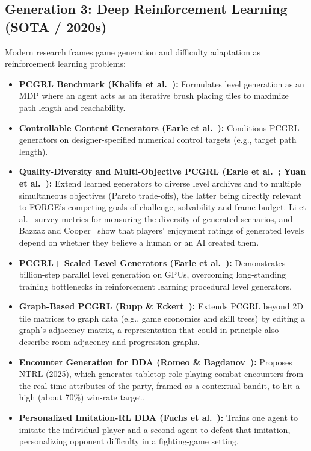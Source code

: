 \subsection{Generation 3: Deep Reinforcement Learning (SOTA / 2020s)}
Modern research frames game generation and difficulty adaptation as reinforcement learning problems:
\begin{itemize}
    \item \textbf{PCGRL Benchmark (Khalifa et al.~\cite{khalifa2020pcgrl}):} Formulates level generation as an MDP where an agent acts as an iterative brush placing tiles to maximize path length and reachability.
    \item \textbf{Controllable Content Generators (Earle et al.~\cite{earle2021controllable}):} Conditions PCGRL generators on designer-specified numerical control targets (e.g., target path length).
    \item \textbf{Quality-Diversity and Multi-Objective PCGRL (Earle et al.~\cite{earle2021illuminating}; Yuan et al.~\cite{yuan2026mopcgrl}):} Extend learned generators to diverse level archives and to multiple simultaneous objectives (Pareto trade-offs), the latter being directly relevant to FORGE's competing goals of challenge, solvability and frame budget. Li et al.~\cite{li2025measuring} survey metrics for measuring the diversity of generated scenarios, and Bazzaz and Cooper~\cite{bazzaz2026imitation} show that players' enjoyment ratings of generated levels depend on whether they believe a human or an AI created them.
    \item \textbf{PCGRL+ Scaled Level Generators (Earle et al.~\cite{earle2024pcgrlplus}):} Demonstrates billion-step parallel level generation on GPUs, overcoming long-standing training bottlenecks in reinforcement learning procedural level generators.
    \item \textbf{Graph-Based PCGRL (Rupp \& Eckert~\cite{rupp2024gpcgrl}):} Extends PCGRL beyond 2D tile matrices to graph data (e.g., game economies and skill trees) by editing a graph's adjacency matrix, a representation that could in principle also describe room adjacency and progression graphs.
    \item \textbf{Encounter Generation for DDA (Romeo \& Bagdanov~\cite{romeo2025ntrl}):} Proposes NTRL (2025), which generates tabletop role-playing combat encounters from the real-time attributes of the party, framed as a contextual bandit, to hit a high (about 70\%) win-rate target.
    \item \textbf{Personalized Imitation-RL DDA (Fuchs et al.~\cite{fuchs2024personalized}):} Trains one agent to imitate the individual player and a second agent to defeat that imitation, personalizing opponent difficulty in a fighting-game setting.

\end{itemize}

